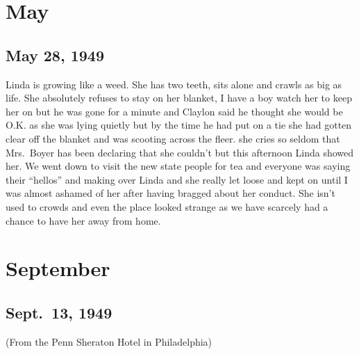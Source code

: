 \documentclass[
]{book}
\begin{document}
\hypertarget{may-1}{%
\section{May}\label{may-1}}

\hypertarget{may-28-1949}{%
\subsection{May 28, 1949}\label{may-28-1949}}

Linda is growing like a weed. She has two teeth, sits alone and crawls as big as life. She absolutely refuses to stay on her blanket, I have a boy watch her to keep her on but he was gone for a minute and Claylon said he thought she would be O.K. as she was lying quietly but by the time he had put on a tie she
had gotten clear off the blanket and was scooting across the fleer. she cries so seldom that Mrs.~Boyer has been declaring that she couldn't but this afternoon Linda showed her. We went down to visit the new state people for tea and everyone was saying their ``hellos'' and making over Linda and she really let loose and kept on until I was almost ashamed of her after having bragged about her conduct. She isn't used to crowds and even the place looked strange as we have scarcely had a chance to have her away from home.

\hypertarget{september-1}{%
\section{September}\label{september-1}}

\hypertarget{sept.-13-1949}{%
\subsection{Sept.~13, 1949}\label{sept.-13-1949}}

(From the Penn Sheraton Hotel in Philadelphia)
\end{document}
